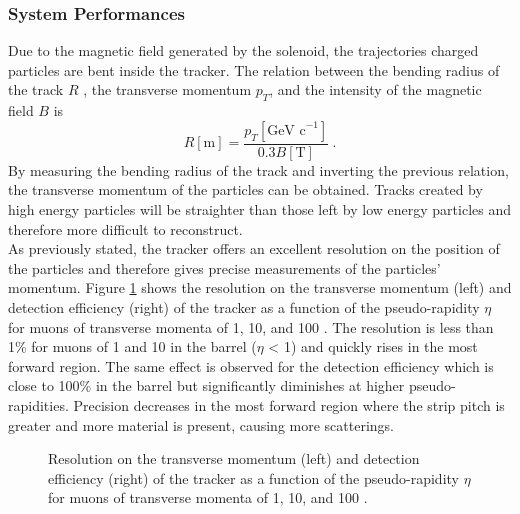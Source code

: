   \subsubsection{System Performances}
  \label{sec:lhc_and_cms__tracker_system_performances}

    Due to the magnetic field generated by the solenoid, the trajectories charged particles are bent inside the tracker. The relation between the bending radius of the track $ R $ , the transverse momentum $ p_T $, and the intensity of the magnetic field $ B $ is
    \begin{equation}
      R[\mbox{m}] = \frac{p_T[\mbox{GeV c}^{-1}]}{0.3 B[\mbox{T}]} \ .
      \label{eq:lhc_and_cms__radius_to_momentum_relation}
    \end{equation}
    By measuring the bending radius of the track and inverting the previous relation, the transverse momentum of the particles can be obtained. Tracks created by high energy particles will be straighter than those left by low energy particles and therefore more difficult to reconstruct. \\

    As previously stated, the tracker offers an excellent resolution on the position of the particles and therefore gives precise measurements of the particles' momentum. Figure \ref{fig:lhc_and_cms__cms_tracker_performances} shows the resolution on the transverse momentum \pT{} (left) and detection efficiency (right) of the tracker as a function of the pseudo-rapidity $ \eta $ for muons of transverse momenta \pT{} of 1, 10, and 100 \GeVc{}. The resolution is less than 1\% for muons of 1 and 10 \GeVc{} in the barrel ($ \eta $ < 1) and quickly rises in the most forward region. The same effect is observed for the detection efficiency which is close to 100\% in the barrel but significantly diminishes at higher pseudo-rapidities. Precision decreases in the most forward region where the strip pitch is greater and more material is present, causing more scatterings.

    \begin{figure}[h!]
      \centering
      \caption{Resolution on the transverse momentum \pT{} (left) and detection efficiency (right) of the tracker as a function of the pseudo-rapidity $ \eta $ for muons of transverse momenta \pT{} of 1, 10, and 100 \GeVc{} \Cite{CMS_at_LHC}.}
      \label{fig:lhc_and_cms__cms_tracker_performances}
    \end{figure}



